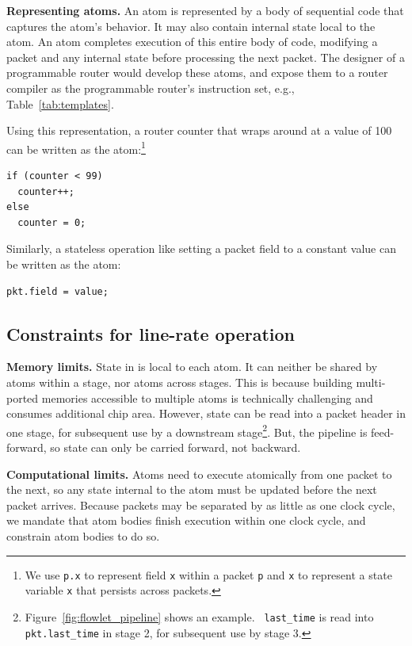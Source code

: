 \medskip
\noindent
\textbf{Representing atoms.}
An atom is represented by a body of sequential code that captures the atom's
behavior. It may also contain internal state local to the atom. An atom
completes execution of this entire body of code, modifying a packet and any
internal state before processing the next packet. The designer of a
programmable router would develop these atoms, and expose them to a router
compiler as the programmable router's instruction set, e.g.,
Table~\ref{tab:templates}.

Using this representation, a router counter that wraps around at a
value of 100 can be written as the atom:\footnote{We use {\tt p.x} to
  represent field {\tt x} within a packet {\tt p} and {\tt x} to
  represent a state variable {\tt x} that persists across packets.}
\begin{lstlisting}[style=customc, numbers=none, frame=none]
if (counter < 99)
  counter++;
else
  counter = 0;
\end{lstlisting}

Similarly, a stateless operation like setting a packet field to a constant
value can be written as the atom:
\begin{lstlisting}[style=customc, numbers=none, frame=none]
  pkt.field = value;
\end{lstlisting}

\subsection{Constraints for line-rate operation}
\label{s:atomConstraints}

\medskip
\noindent
\textbf{Memory limits.} State in \absmachine is local to each atom.  It can
neither be shared by atoms within a stage, nor atoms across stages. This is
because building multi-ported memories accessible to multiple atoms is
technically challenging and consumes additional chip area. However, state can
be read into a packet header in one stage, for subsequent use by a downstream
stage\footnote{Figure~\ref{fig:flowlet_pipeline} shows an example. {\tt
last\_time} is read into {\tt pkt.last\_time} in stage 2, for subsequent use by stage 3.}.  But, the \absmachine pipeline is
feed-forward, so state can only be carried forward, not backward.

\medskip
\noindent
\textbf{Computational limits.} Atoms need to execute atomically from one packet
to the next, so any state internal to the atom must be updated
before the next packet arrives.  Because packets may be separated by as little
as one clock cycle, we mandate that atom bodies finish execution within one
clock cycle, and constrain atom bodies to do so.

